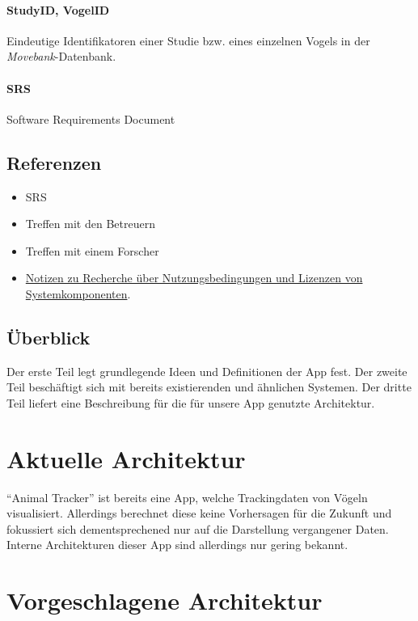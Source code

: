 \documentclass[12pt]{article} %
\begin{document}
	\paragraph{StudyID, VogelID} Eindeutige Identifikatoren einer Studie bzw. eines einzelnen Vogels in der \textit{Movebank}-Datenbank.  
	\paragraph{SRS} Software Requirements Document



\subsection{Referenzen}
\begin{itemize}
	\item SRS
	\item Treffen mit den Betreuern
	\item Treffen mit einem Forscher
	\item \href{https://git.uni-konstanz.de/kn/swp2018/group12/tree/master/Dokumentation/Lizenzen}{Notizen zu Recherche über Nutzungsbedingungen und Lizenzen von Systemkomponenten}.
\end{itemize}


\subsection{Überblick}

Der erste Teil legt grundlegende Ideen und Definitionen der App fest. Der zweite Teil beschäftigt sich mit bereits existierenden und ähnlichen Systemen. Der dritte Teil liefert eine Beschreibung für die für unsere App genutzte Architektur.  





\section{Aktuelle Architektur}

\enquote{Animal Tracker} ist bereits eine App, welche Trackingdaten von Vögeln visualisiert. Allerdings berechnet diese keine Vorhersagen für die Zukunft und fokussiert sich dementsprechened nur auf die Darstellung vergangener Daten. Interne Architekturen dieser App sind allerdings nur gering bekannt.


\section{Vorgeschlagene Architektur}
\end{document}
